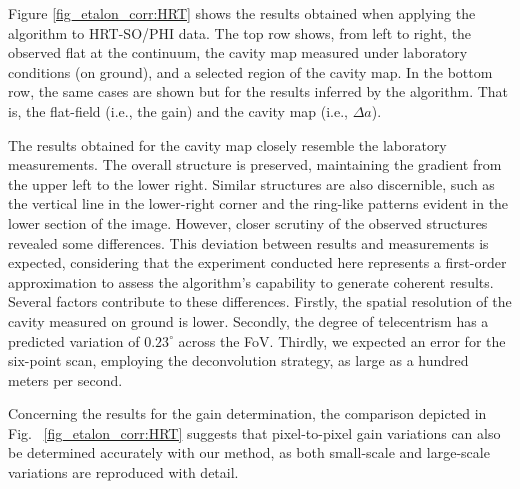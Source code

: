 Figure \ref{fig_etalon_corr:HRT} shows the results obtained when applying the algorithm to HRT-SO/PHI data. The top row shows, from left to right, the observed flat at the continuum, the cavity map measured under laboratory conditions (on ground), and a selected region of the cavity map. In the bottom row, the same cases are shown but for the results inferred by the algorithm. That is, the flat-field (i.e., the gain) and the cavity map (i.e., $\Delta a$).

The results obtained for the cavity map closely resemble the laboratory measurements. The overall structure is preserved, maintaining the gradient from the upper left to the lower right. Similar structures are also discernible, such as the vertical line in the lower-right corner and the ring-like patterns evident in the lower section of the image. However, closer scrutiny of the observed structures revealed some differences. This deviation between results and measurements is expected, considering that the experiment conducted here represents a first-order approximation to assess the algorithm's capability to generate coherent results. Several factors contribute to these differences. Firstly, the spatial resolution of the cavity measured on ground is lower. Secondly, the degree of telecentrism has a predicted variation of $0.23^\circ$ across the FoV. Thirdly, we expected an error for the six-point scan, employing the deconvolution strategy, as large as a hundred meters per second.

Concerning the results for the gain determination, the comparison depicted in Fig.~ \ref{fig_etalon_corr:HRT} suggests that pixel-to-pixel gain variations can also be determined accurately with our method, as both small-scale and large-scale variations are reproduced with detail. 

